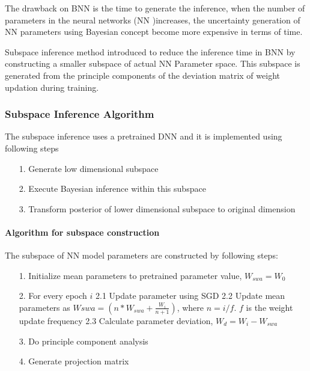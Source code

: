 \documentclass[12pt,a4paper]{article}
\begin{document}
The drawback on BNN is the time to generate the inference, when  the number of parameters in the neural networks (NN )increases, the uncertainty generation of NN parameters using Bayesian concept become more expensive in terms of time.

Subspace inference method introduced to reduce the inference time in BNN by constructing a smaller subspace of actual NN Parameter space. This subspace is generated from the  principle  components of the deviation matrix of weight updation during training.

\subsubsection{Subspace Inference Algorithm}
The subspace inference uses a pretrained DNN and it is implemented using following steps

\begin{itemize}
\item[1. ] Generate low dimensional subspace


\item[2. ] Execute Bayesian inference within this subspace


\item[3. ] Transform posterior of lower dimensional subspace to original dimension

\end{itemize}
\paragraph{Algorithm for subspace construction}
The subspace of NN model parameters are constructed by following steps:

\begin{itemize}
\item[1. ] Initialize mean parameters to pretrained parameter value, $W_{swa} = W_0$


\item[2. ] For every epoch $i$   2.1 Update parameter using SGD  2.2 Update mean parameters as  $Wswa = (n*W_{swa} + \frac{W_{i}}{n+1})$, where $n = i/f$. $f$ is the weight update frequency  2.3 Calculate parameter deviation, $W_{d} = W_{i}-W_{swa}$


\item[3. ] Do principle component analysis


\item[4. ] Generate projection matrix

\end{itemize}
\end{document}
